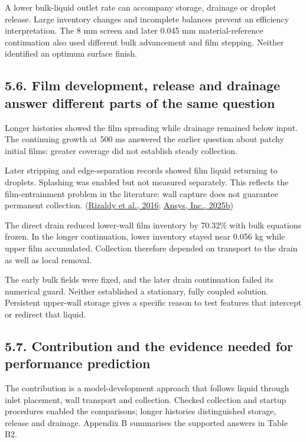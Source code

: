 \documentclass[
  12pt,
  a4paper,
]{article}
\begin{document}
A lower bulk-liquid outlet rate can accompany storage, drainage or
droplet release. Large inventory changes and incomplete balances prevent
an efficiency interpretation. The 8 mm screen and later 0.045 mm
material-reference continuation also used different bulk advancement and
film stepping. Neither identified an optimum surface finish.

\subsection{5.6. Film development, release and drainage answer different
parts of the same
question}\label{film-development-release-and-drainage-answer-different-parts-of-the-same-question}

Longer histories showed the film spreading while drainage remained below
input. The continuing growth at 500 ms answered the earlier question
about patchy initial films: greater coverage did not establish steady
collection.

Later stripping and edge-separation records showed film liquid returning
to droplets. Splashing was enabled but not measured separately. This
reflects the film-entrainment problem in the literature: wall capture
does not guarantee permanent collection.
(\href{https://www.researchgate.net/publication/310818568_LIQUID_CARRYOVER_IN_GEOTHERMAL_STEAM-WATER_SEPARATORS}{Rizaldy
et al., 2016};
\href{https://ansyshelp.ansys.com/public/Views/Secured/corp/v252/en/flu_th/flu_th_ewf_sec_film_submodels.html}{Ansys,
Inc., 2025b})

The direct drain reduced lower-wall film inventory by 70.32\% with bulk
equations frozen. In the longer continuation, lower inventory stayed
near 0.056 kg while upper film accumulated. Collection therefore
depended on transport to the drain as well as local removal.

The early bulk fields were fixed, and the later drain continuation
failed its numerical guard. Neither established a stationary, fully
coupled solution. Persistent upper-wall storage gives a specific reason
to test features that intercept or redirect that liquid.

\subsection{5.7. Contribution and the evidence needed for performance
prediction}\label{contribution-and-the-evidence-needed-for-performance-prediction}

The contribution is a model-development approach that follows liquid
through inlet placement, wall transport and collection. Checked
collection and startup procedures enabled the comparisons; longer
histories distinguished storage, release and drainage. Appendix B
summarises the supported answers in Table B2.
\end{document}
